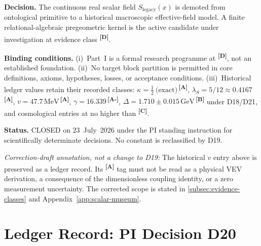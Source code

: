 \documentclass[12pt,a4paper,twoside]{article}
\theoremstyle{plain}
\theoremstyle{definition}
\theoremstyle{remark}
\newcommand{\GeV}{\,\mathrm{GeV}}
\newcommand{\MeV}{\,\mathrm{MeV}}
\newcommand{\catmark}[1]{\textsuperscript{\textsf{\textbf{[#1]}}}}
\newcommand{\LegacySx}{S_{\mathrm{legacy}}(x)} %
\newcommand{\Sx}{\LegacySx} %
\newcommand{\lambdaS}{5/12 \approx 0.4167} %
\newcommand{\DeltaGap}{1.710 \pm 0.015\GeV} %
\newcommand{\GammaGeom}{16.339} %
\newcommand{\vVEV}{47.7\MeV} %
\newcommand{\KappaRG}{\tfrac{1}{2}\ \text{(exact)}} %
\begin{document}
\begin{pioverridebox}
\textbf{Decision.} The continuous real scalar field $\Sx$ is demoted from
ontological primitive to a historical macroscopic effective-field model. A
finite relational-algebraic pregeometric kernel is the active candidate under
investigation at evidence class \catmark{D}.

\textbf{Binding conditions.}
(i)~Part~I is a formal research programme at \catmark{D}, not an established
foundation.
(ii)~No target block partition is permitted in core definitions, axioms,
hypotheses, losses, or acceptance conditions.
(iii)~Historical ledger values retain their recorded classes:
$\kappa = \KappaRG$\,\catmark{A}, $\lambda_S = \lambdaS$\,\catmark{A},
$v = \vVEV$\,\catmark{A}, $\gamma = \GammaGeom$\,\catmark{A-},
$\Delta = \DeltaGap$\,\catmark{B} under D18/D21, and cosmological entries
at no higher than \catmark{C}.

\textbf{Status.} CLOSED on 23~July~2026 under the PI standing instruction for
scientifically determinate decisions. No constant is reclassified by D19.
\end{pioverridebox}

\noindent\textit{Correction-draft annotation, not a change to D19:} The historical
$v$ entry above is preserved as a ledger record. Its \catmark{A} tag must not
be read as a physical VEV derivation, a consequence of the dimensionless
coupling identity, or a zero measurement uncertainty. The corrected scope is
stated in \cref{subsec:evidence-classes} and Appendix~\ref{app:scalar-museum}.

\section{Ledger Record: PI Decision D20}
\label{sec:d20-ledger-record}
\end{document}
